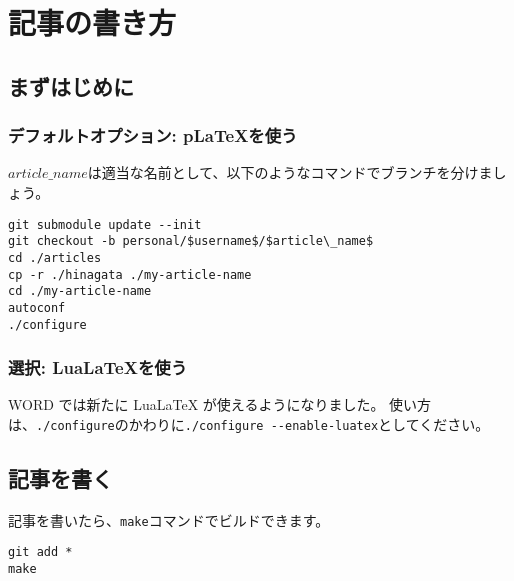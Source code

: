 \usepackage{listings}
\lstset{
  basicstyle=\ttfamily,
  commentstyle=\textit,
  frame=trBL,
  numbers=left,
  breaklines=true,                 %
  language=TeX,                 %
  title=\lstname                   %
}
\usepackage{fancybox}
\usepackage{url}

\subtitle{ヘッダの見出し}
\author{ほげ}



\chapter{記事の書き方}

\section{まずはじめに}

\subsection{デフォルトオプション: p\LaTeX を使う}

$article\_name$は適当な名前として、以下のようなコマンドでブランチを分けましょう。

\begin{lstlisting}[mathescape]
git submodule update --init
git checkout -b personal/$username$/$article\_name$
cd ./articles
cp -r ./hinagata ./my-article-name
cd ./my-article-name
autoconf
./configure
\end{lstlisting}

\subsection{選択: Lua\LaTeX を使う}

WORD では新たに LuaLaTeX が使えるようになりました。
使い方は、\lstinline|./configure|のかわりに\lstinline|./configure --enable-luatex|としてください。

\section{記事を書く}

記事を書いたら、\lstinline|make|コマンドでビルドできます。

\begin{lstlisting}
git add *
make
\end{lstlisting}


